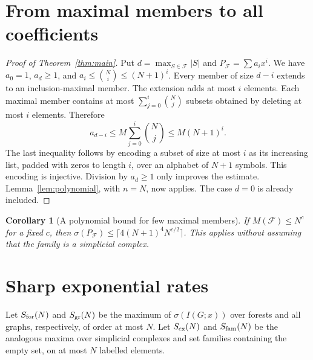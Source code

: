 \documentclass[11pt]{article}
\newtheorem{corollary}[theorem]{Corollary}
\begin{document}
\section{From maximal members to all coefficients}
\begin{proof}[Proof of Theorem~\ref{thm:main}]
Put $d=\max_{S\in\mathcal F}|S|$ and $P_{\mathcal F}=\sum a_ix^i$.
We have $a_0=1$, $a_d\ge1$, and $a_i\le\binom Ni\le(N+1)^i$.
Every member of size $d-i$ extends to an inclusion-maximal member.
The extension adds at most $i$ elements. Each maximal member contains at
most $\sum_{j=0}^{i}\binom Nj$ subsets obtained by deleting at most $i$
elements. Therefore
\[
 a_{d-i}\le M\sum_{j=0}^{i}\binom Nj\le M(N+1)^i.
\tag{3}
\]
The last inequality follows by encoding a subset of size at most $i$ as
its increasing list, padded with zeros to length $i$, over an alphabet
of $N+1$ symbols. This encoding is injective. Division by $a_d\ge1$
only improves the estimate. Lemma~\ref{lem:polynomial}, with $n=N$,
now applies. The case $d=0$ is already included.
\end{proof}

\begin{corollary}[A polynomial bound for few maximal members]
If $M(\mathcal F)\le N^c$ for a fixed $c$, then
$\sigma(P_{\mathcal F})\le\lceil4(N+1)^4N^{c/2}\rceil$.
This applies without assuming that the family is a simplicial complex.
\end{corollary}

\section{Sharp exponential rates}
Let $S_{\rm for}(N)$ and $S_{\rm gr}(N)$ be the maximum of
$\sigma(I(G;x))$ over forests and all graphs, respectively, of order at
most $N$. Let $S_{\rm cx}(N)$ and $S_{\rm fam}(N)$ be the analogous
maxima over simplicial complexes and set families containing the empty
set, on at most $N$ labelled elements.
\end{document}

